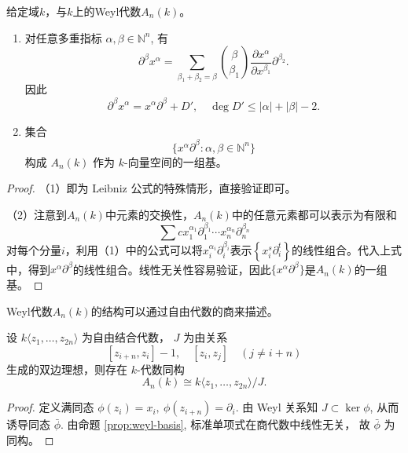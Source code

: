 \begin{proposition}\label{prop:weyl-basis}
    给定域$k$，与$k$上的Weyl代数$A_n(k)$。
    \begin{enumerate}
        \item 对任意多重指标 $\alpha,\beta\in\mathbb{N}^n$,
              有
              \[
                  \partial^\beta x^\alpha
                  =
                  \sum_{\beta_1+\beta_2=\beta}
                  \binom{\beta}{\beta_1}
                  \frac{\partial x^\alpha}{\partial x^{\beta_1}}
                  \partial^{\beta_2}.
              \]
              因此
              \[
                  \partial^\beta x^\alpha
                  =
                  x^\alpha\partial^\beta+D',
                  \quad
                  \deg D'\le |\alpha|+|\beta|-2.
              \]

        \item 集合
              \[
                  \{x^\alpha\partial^\beta:
                  \alpha,\beta\in\mathbb{N}^n\}
              \]
              构成 $A_n(k)$ 作为 $k$-向量空间的一组基。
    \end{enumerate}
    \begin{proof}
        （1）即为 Leibniz 公式的特殊情形，直接验证即可。

        （2）注意到$A_n(k)$中元素的交换性，$A_n(k)$中的任意元素都可以表示为有限和
        \begin{equation*}
            \sum c x_1^{\alpha_1}\partial_1^{\beta_1}\cdots x_n^{\alpha_n}\partial_n^{\beta_n}
        \end{equation*}
        对每个分量$i$，利用（1）中的公式可以将$x_i^{\alpha_i}\partial_i^{\beta_i}$表示$\left\{x_i^s\partial_i^t\right\}$的线性组合。代入上式 中，得到$x^\alpha\partial^\beta$的线性组合。线性无关性容易验证，因此$\{x^\alpha\partial^\beta\}$是$A_n(k)$的一组基。
    \end{proof}
\end{proposition}

Weyl代数$A_n(k)$的结构可以通过自由代数的商来描述。

\begin{theorem}
    \label{thm:A}
    设 $k\langle z_1,\dots,z_{2n}\rangle$
    为自由结合代数，
    $J$ 为由关系
    \[
        [z_{i+n},z_i]-1,\quad
        [z_i,z_j]\quad (j\neq i+n)
    \]
    生成的双边理想，则存在 $k$-代数同构
    \[
        A_n(k)\cong k\langle z_1,\dots,z_{2n}\rangle/J.
    \]
\end{theorem}

\begin{proof}
    定义满同态
    $\phi(z_i)=x_i,\ \phi(z_{i+n})=\partial_i$.
    由 Weyl 关系知 $J\subset\ker\phi$,
    从而诱导同态
    $\bar\phi$.
    由命题 \ref{prop:weyl-basis},
    标准单项式在商代数中线性无关，
    故 $\bar\phi$ 为同构。
\end{proof}

